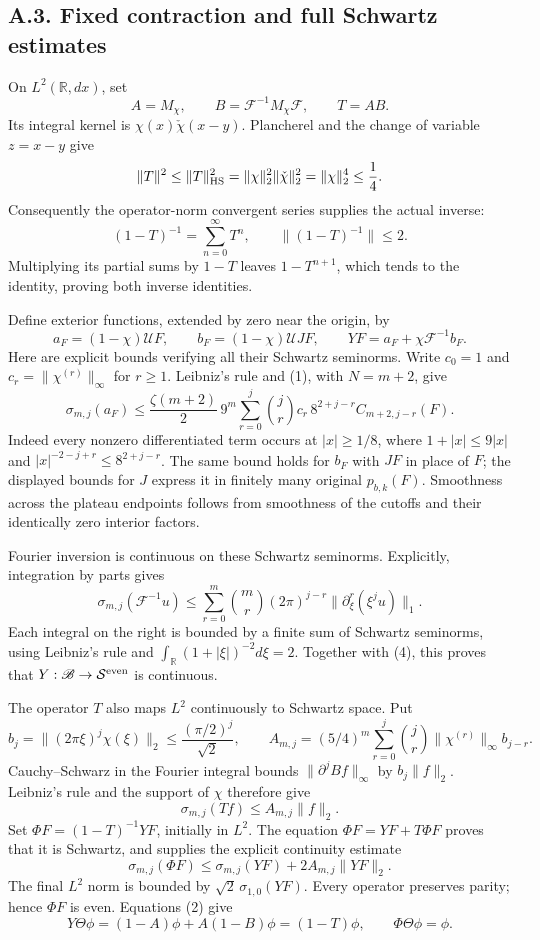 \documentclass[
  11pt,
]{article}
\begin{document}
\subsection{A.3. Fixed contraction and full Schwartz
estimates}\label{a.3.-fixed-contraction-and-full-schwartz-estimates}

On \(L^2(\mathbb R,dx)\), set \[
A=M_\chi,\qquad B=\mathcal F^{-1}M_\chi\mathcal F,\qquad T=AB.
\] Its integral kernel is \(\chi(x)\check\chi(x-y)\). Plancherel and the
change of variable \(z=x-y\) give \[
\|T\|^2\le\|T\|_{\rm HS}^2
=\|\chi\|_2^2\|\check\chi\|_2^2
=\|\chi\|_2^4\le\frac14.
\] Consequently the operator-norm convergent series supplies the actual
inverse: \[
\boxed{(1-T)^{-1}=\sum_{n=0}^{\infty}T^n,\qquad
\|(1-T)^{-1}\|\le2.}                                 \tag{3}
\] Multiplying its partial sums by \(1-T\) leaves \(1-T^{n+1}\), which
tends to the identity, proving both inverse identities.

Define exterior functions, extended by zero near the origin, by \[
a_F=(1-\chi)\mathcal UF,\qquad
b_F=(1-\chi)\mathcal UJF,\qquad
YF=a_F+\chi\mathcal F^{-1}b_F.
\] Here are explicit bounds verifying all their Schwartz seminorms.
Write \(c_0=1\) and \(c_r=\|\chi^{(r)}\|_\infty\) for \(r\ge1\).
Leibniz's rule and (1), with \(N=m+2\), give \[
\sigma_{m,j}(a_F)
\le\frac{\zeta(m+2)}2\,9^m
\sum_{r=0}^j\binom jr c_r\,8^{2+j-r}C_{m+2,j-r}(F).  \tag{4}
\] Indeed every nonzero differentiated term occurs at \(|x|\ge1/8\),
where \(1+|x|\le9|x|\) and \(|x|^{-2-j+r}\le8^{2+j-r}\). The same bound
holds for \(b_F\) with \(JF\) in place of \(F\); the displayed bounds
for \(J\) express it in finitely many original \(p_{b,k}(F)\).
Smoothness across the plateau endpoints follows from smoothness of the
cutoffs and their identically zero interior factors.

Fourier inversion is continuous on these Schwartz seminorms. Explicitly,
integration by parts gives \[
\sigma_{m,j}(\mathcal F^{-1}u)
\le\sum_{r=0}^m\binom mr(2\pi)^{j-r}
\bigl\|\partial_\xi^r(\xi^ju)\bigr\|_1.
\] Each integral on the right is bounded by a finite sum of Schwartz
seminorms, using Leibniz's rule and
\(\int_{\mathbb R}(1+|\xi|)^{-2}d\xi=2\). Together with (4), this proves
that \(Y:\mathscr B\to\mathcal S^{\rm even}\) is continuous.

The operator \(T\) also maps \(L^2\) continuously to Schwartz space. Put
\[
b_j=\|(2\pi\xi)^j\chi(\xi)\|_2
\le\frac{(\pi/2)^j}{\sqrt2},\qquad
A_{m,j}=(5/4)^m
\sum_{r=0}^j\binom jr\|\chi^{(r)}\|_\infty b_{j-r}.
\] Cauchy--Schwarz in the Fourier integral bounds
\(\|\partial^jBf\|_\infty\) by \(b_j\|f\|_2\). Leibniz's rule and the
support of \(\chi\) therefore give \[
\sigma_{m,j}(Tf)\le A_{m,j}\|f\|_2.
\] Set \(\Phi F=(1-T)^{-1}YF\), initially in \(L^2\). The equation
\(\Phi F=YF+T\Phi F\) proves that it is Schwartz, and supplies the
explicit continuity estimate \[
\sigma_{m,j}(\Phi F)
\le\sigma_{m,j}(YF)+2A_{m,j}\|YF\|_2.                 \tag{5}
\] The final \(L^2\) norm is bounded by \(\sqrt2\,\sigma_{1,0}(YF)\).
Every operator preserves parity; hence \(\Phi F\) is even. Equations (2)
give \[
Y\Theta\phi=(1-A)\phi+A(1-B)\phi=(1-T)\phi,
\qquad \Phi\Theta\phi=\phi.                          \tag{6}
\]
\end{document}
